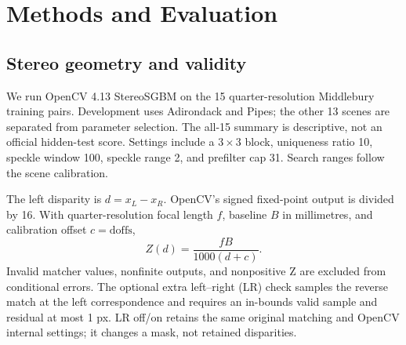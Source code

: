 \documentclass[10pt,twocolumn,letterpaper]{article}
\begin{document}
\begin{center}\begin{minipage}{\linewidth}\centering
{}
\end{minipage}\end{center}

\section{Methods and Evaluation}
\subsection{Stereo geometry and validity}
We run OpenCV 4.13 StereoSGBM on the 15 quarter-resolution Middlebury training pairs. Development uses Adirondack and Pipes; the other 13 scenes are separated from parameter selection. The all-15 summary is descriptive, not an official hidden-test score. Settings include a $3\times3$ block, uniqueness ratio 10, speckle window 100, speckle range 2, and prefilter cap 31. Search ranges follow the scene calibration.

The left disparity is $d=x_L-x_R$. OpenCV's signed fixed-point output is divided by 16. With quarter-resolution focal length $f$, baseline $B$ in millimetres, and calibration offset $c=\mathrm{doffs}$,
\begin{equation}
Z(d)=\frac{fB}{1000(d+c)}.
\label{eq:depth}
\end{equation}
Invalid matcher values, nonfinite outputs, and nonpositive Z are excluded from conditional errors. The optional extra left--right (LR) check samples the reverse match at the left correspondence and requires an in-bounds valid sample and residual at most 1 px. LR off/on retains the same original matching and OpenCV internal settings; it changes a mask, not retained disparities.
\end{document}
